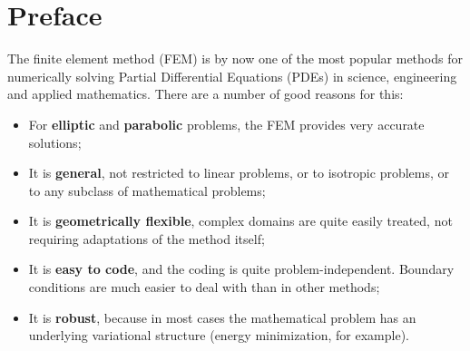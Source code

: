 \chapter*{Preface}


The finite element method (FEM) is by now one of the most popular
methods for numerically solving Partial Differential Equations (PDEs) in
science, engineering and applied mathematics. There are a number of
good reasons for this:

\begin{itemize}
	\item[\Smiley] For \textbf{elliptic}
	and \textbf{parabolic} problems,
	the FEM provides very accurate solutions;\\
	
	\item[\Smiley] It is \textbf{general}, not restricted to linear problems,
	or to isotropic problems, or to any subclass of mathematical
	problems; \\
	
	\item[\Smiley] It is \textbf{geometrically flexible}, complex domains
	are quite easily treated, not requiring adaptations of the
	method itself; \\
	
	\item[\Smiley] It is \textbf{easy to code}, and the coding is quite problem-independent.
	Boundary conditions are much easier to deal with than in other methods; \\
	
	\item[\Smiley] It is \textbf{robust}, because in most cases the mathematical problem
	has an underlying variational structure (energy minimization, for example). \\
	
\end{itemize}

